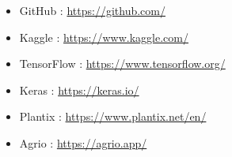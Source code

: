 \documentclass[12pt,a4paper,oneside]{report}
\begin{document}
\begin{itemize}
    \item GitHub : \url{https://github.com/}
    \item Kaggle : \url{https://www.kaggle.com/}
    \item TensorFlow : \url{https://www.tensorflow.org/}
    \item Keras : \url{https://keras.io/}
    \item Plantix : \url{https://www.plantix.net/en/}
    \item Agrio : \url{https://agrio.app/}
\end{itemize}
\end{document}
